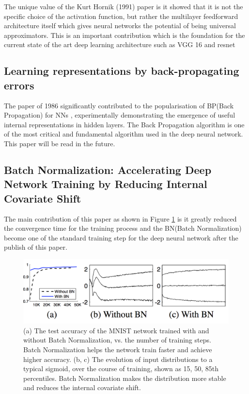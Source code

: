 \documentclass[a4paper,12pt]{article}
\begin{document}
The unique value of the Kurt Hornik (1991) \cite{hornik1991} paper is it showed that it is not the specific choice of the activation function, but rather the multilayer feedforward architecture itself which gives neural networks the potential of being universal approximators. This is an important contribution which is the foundation for the current state of the art deep learning architecture such as VGG 16  \cite{SimonyanZ14a} and resnet \cite{DBLP:journals/corr/HeZRS15}




\subsection{Learning representations by back-propagating errors\cite{Rumelhart1986}}
The paper of 1986 significantly contributed to the popularisation of BP(Back Propagation) for NNs \cite{Rumelhart1986}, experimentally demonstrating the emergence of useful internal representations in hidden layers. The Back Propagation algorithm is one of the most critical and fundamental algorithm used in the deep neural network.
This paper will be read in the future.\\
\subsection{Batch Normalization: Accelerating Deep Network Training by Reducing
               Internal Covariate Shift\cite{DBLP:journals/corr/IoffeS15}}
The main contribution of this paper as shown in Figure \ref{fig:bp} is it greatly reduced the convergence time for the training process and the BN(Batch Normalization) become one of the standard training step for the deep neural network after the publish of this paper.\\
\begin{figure}[H]
  \begin{center}
      \includegraphics[scale=0.6]{bn.png}
\end{center}
\caption{(a) The test accuracy of the MNIST network trained with and without Batch Normalization, vs. the number of training steps. Batch Normalization helps the network train faster and achieve higher accuracy\cite{DBLP:journals/corr/IoffeS15}. (b, c) The evolution of input distributions to a typical sigmoid, over the course of training, shown as  15, 50, 85th percentiles. Batch Normalization makes the distribution more stable and reduces the internal covariate shift\cite{DBLP:journals/corr/IoffeS15}.}
 \label{fig:bp}
 \end{figure}
\end{document}
